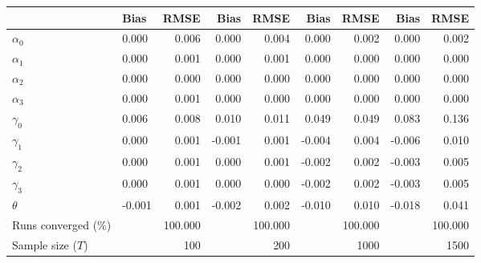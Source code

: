 
\begin{tabular}[t]{llrrrrrrr}
\toprule
  & Bias & RMSE & Bias & RMSE & Bias & RMSE & Bias & RMSE\\
\midrule
$\alpha_{0}$ & 0.000 & 0.006 & 0.000 & 0.004 & 0.000 & 0.002 & 0.000 & 0.002\\
$\alpha_{1}$ & 0.000 & 0.001 & 0.000 & 0.001 & 0.000 & 0.000 & 0.000 & 0.000\\
$\alpha_{2}$ & 0.000 & 0.000 & 0.000 & 0.000 & 0.000 & 0.000 & 0.000 & 0.000\\
$\alpha_{3}$ & 0.000 & 0.001 & 0.000 & 0.000 & 0.000 & 0.000 & 0.000 & 0.000\\
$\gamma_{0}$ & 0.006 & 0.008 & 0.010 & 0.011 & 0.049 & 0.049 & 0.083 & 0.136\\
$\gamma_{1}$ & 0.000 & 0.001 & -0.001 & 0.001 & -0.004 & 0.004 & -0.006 & 0.010\\
$\gamma_{2}$ & 0.000 & 0.001 & 0.000 & 0.001 & -0.002 & 0.002 & -0.003 & 0.005\\
$\gamma_{3}$ & 0.000 & 0.001 & 0.000 & 0.000 & -0.002 & 0.002 & -0.003 & 0.005\\
$\theta$ & -0.001 & 0.001 & -0.002 & 0.002 & -0.010 & 0.010 & -0.018 & 0.041\\
Runs converged (\%) &  & 100.000 &  & 100.000 &  & 100.000 &  & 100.000\\
Sample size ($T$) &  & 100 &  & 200 &  & 1000 &  & 1500\\
\bottomrule
\end{tabular}
